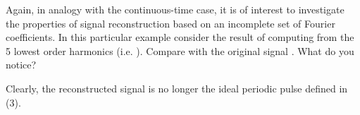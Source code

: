\documentclass{article}
\begin{document}
\begin{CellGroup}
\begin{CellGroup}
\end{CellGroup}
Again, in analogy with the continuous-time case, it is of interest to investigate the properties of signal reconstruction based on an incomplete
set of Fourier coefficients. In this particular example consider the result of computing  from the 5 lowest
order harmonics (i.e. ).  Compare with the original signal .  What do you notice?



\begin{CellGroup}

\end{CellGroup}
Clearly, the reconstructed signal is no longer the ideal periodic pulse defined in (3).


\end{CellGroup}
\end{document}
